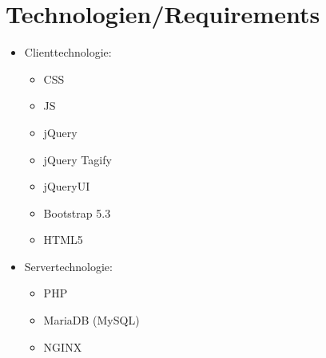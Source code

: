 \documentclass{article}
\begin{document}
\pagebreak
\section{Technologien/Requirements}

\begin{itemize}
    \item Clienttechnologie: 
    \begin{itemize}
        \item CSS
        \item JS
        \item jQuery
        \item jQuery Tagify
        \item jQueryUI
        \item Bootstrap 5.3
        \item HTML5
    \end{itemize}
    
    \item Servertechnologie: 
    \begin{itemize}
        \item PHP
        \item MariaDB (MySQL)
        \item NGINX
    \end{itemize}
    

\end{itemize}
\end{document}
